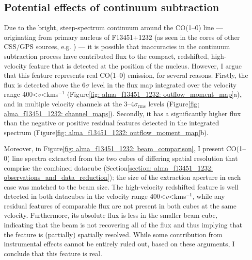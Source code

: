 \vspace*{\fill}
\newpage

\subsection{Potential effects of continuum subtraction}
\label{section: alma_f13451_1232: analysis_and_results: potential_effects_of_continuum_subtraction}

Due to the bright, steep-spectrum continuum around the CO(1--0) line --- originating from primary nucleus of F13451+1232 (as seen in the cores of other CSS/GPS sources, e.g. \citealt{Oosterloo2019}) --- it is possible that inaccuracies in the continuum subtraction process have contributed flux to the compact, redshifted, high-velocity feature that is detected at the position of the nucleus. However, I argue that this feature represents real CO(1--0) emission, for several reasons. Firstly, the flux is detected above the $6\sigma$ level in the flux map integrated over the velocity range 400\;\textless\;$v$\;\textless{}\;km\;s$^{-1}$ (Figure\;\ref{fig: alma_f13451_1232: outflow_moment_map}a), and in multiple velocity channels at the 3--4$\sigma_\mathrm{rms}$ levels (Figure\;\ref{fig: alma_f13451_1232: channel_maps}). Secondly, it has a significantly higher flux than the negative or positive residual features detected in the integrated spectrum (Figure\;\ref{fig: alma_f13451_1232: outflow_moment_map}b). 

Moreover, in Figure\;\ref{fig: alma_f13451_1232: beam_comparison}, I present CO(1--0) line spectra extracted from the two cubes of differing spatial resolution that comprise the combined datacube (Section\;\ref{section: alma_f13451_1232: observations_and_data_reduction}); the size of the extraction aperture in each case was matched to the beam size. The high-velocity redshifted feature is well detected in both datacubes in the velocity range 400\;\textless\;$v$\;\textless{}\;km\;s$^{-1}$, while any residual features of comparable flux are not present in both cubes at the same velocity. Furthermore, its absolute flux is less in the smaller-beam cube, indicating that the beam is not recovering all of the flux and thus implying that the feature is (partially) spatially resolved. While some contribution from instrumental effects cannot be entirely ruled out, based on these arguments, I conclude that this feature is real.



